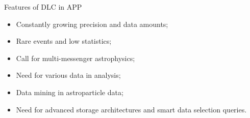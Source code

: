 
\begin{frame}{Features of DLC in APP}
    \begin{minipage}[c]{0.64\textwidth}
        \begin{itemize}
            \item Constantly growing precision and data amounts;
            \item Rare events and low statistics;
            \item Call for multi-messenger astrophysics;
            \item Need for various data in analysis;
            \item Data mining in astroparticle data;
            \item Need for advanced storage architectures and smart data selection queries.




\end{itemize}
\end{minipage}
\end{frame}
